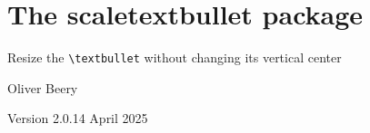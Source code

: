 \documentclass{article}
\begin{document}
\section*{\Large The \textsf{scaletextbullet} package}

Resize the \texttt{\textbackslash{}textbullet} without changing its vertical center

Oliver Beery

Version 2.0.1\quad{}4 April 2025

%
\end{document}
